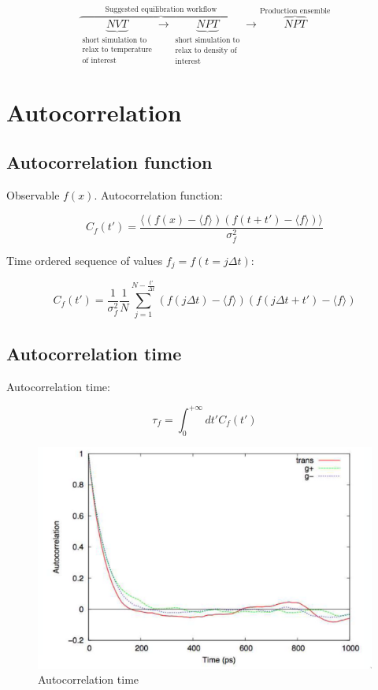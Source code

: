 						$$\overbrace{\underbrace{NVT}_{\substack{\text{short simulation to}\\\text{relax to temperature}\\\text{of interest}}}\rightarrow \underbrace{NPT}_{\substack{\text{short simulation to}\\\text{relax to density of}\\\text{interest}}}}^{\text{Suggested equilibration workflow}}\rightarrow	\overbrace{NPT}^{\text{Production ensemble}}$$


\section{Autocorrelation}

	\subsection{Autocorrelation function}
	Observable $f(x)$.
	Autocorrelation function:

	$$C_f(t') = \frac{\bigl\langle(f(x)-\langle f\rangle)(f(t+t') - \langle f\rangle)\bigr\rangle}{\sigma^2_f}$$

	Time ordered sequence of values $f_j = f(t=j\Delta t)$:

	$$C_f(t') = \frac{1}{\sigma^2_f}\frac{1}{N}\sum\limits_{j=1}^{N-\frac{t'}{\Delta t}}(f(j\Delta t)-\langle f\rangle)(f(j\Delta t + t')-\langle f\rangle)$$

	\subsection{Autocorrelation time}
	Autocorrelation time:

	$$\tau_f = \int_0^{+\infty} dt' C_f(t')$$

	\begin{figure}[H]
		\includegraphics[width = \textwidth]{autocorrelation-time}
		\caption{Autocorrelation time}
		\label{fig:autocorrelation-time}
	\end{figure}


